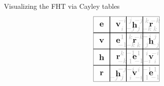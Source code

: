 \documentclass[8pt]{beamer}
\begin{document}
\begin{frame}{Visualizing the FHT via Cayley tables}
\[\begin{tikzpicture}[scale=.42]
\begin{scope}[shift={(14,0)}]
      \node at (3.5,1.5) {$-j$};
      \node at (4.5,8.5) {$-i$};
      \node at (4.5,7.5) {$i$};
      \node at (4.5,6.5) {$1$};
      \node at (4.5,5.5) {$-1$}; 
      \node at (4.5,4.5) {$k$}; 
      \node at (4.5,3.5) {$-k$};
      \node at (4.5,2.5) {$-j$};
      \node at (4.5,1.5) {$j$};
      \node at (5.5,8.5) {$j$};
      \node at (5.5,7.5) {$-j$};
      \node at (5.5,6.5) {$k$};
      \node at (5.5,5.5) {$-k$}; 
      \node at (5.5,4.5) {$-1$}; 
      \node at (5.5,3.5) {$1$};
      \node at (5.5,2.5) {$-i$};
      \node at (5.5,1.5) {$i$};
      \node at (6.5,8.5) {$-j$};
      \node at (6.5,7.5) {$j$};
      \node at (6.5,6.5) {$-k$};
      \node at (6.5,5.5) {$k$}; 
      \node at (6.5,4.5) {$1$}; 
      \node at (6.5,3.5) {$-1$};
      \node at (6.5,2.5) {$i$};
      \node at (6.5,1.5) {$-i$};
      \node at (7.5,8.5) {$k$};
      \node at (7.5,7.5) {$-k$};
      \node at (7.5,6.5) {$-j$};
      \node at (7.5,5.5) {$j$}; 
      \node at (7.5,4.5) {$i$}; 
      \node at (7.5,3.5) {$-i$};
      \node at (7.5,2.5) {$-1$};
      \node at (7.5,1.5) {$1$};
      \node at (8.5,8.5) {$-k$};
      \node at (8.5,7.5) {$k$};
      \node at (8.5,6.5) {$j$};
      \node at (8.5,5.5) {$-j$}; 
      \node at (8.5,4.5) {$-i$}; 
      \node at (8.5,3.5) {$i$};
      \node at (8.5,2.5) {$1$};
      \node at (8.5,1.5) {$-1$};
      \filldraw[fill=white,opacity=0.7] 
      (1,1)--(9,1)--(9,9)--(1,9)--cycle;
      \draw[thick] (3,1)--(3,9);
      \draw[thick] (5,1)--(5,9);
      \draw[thick] (7,1)--(7,9); 
      \draw[thick] (1,3)--(9,3);
      \draw[thick] (1,5)--(9,5);
      \draw[thick] (1,7)--(9,7);
      \node at (2,8) {\large\bf $\mathbf{e}$};
      \node at (4,8) {\large\bf $\mathbf{v}$};
      \node at (6,8) {\large\bf $\mathbf{h}$};
      \node at (8,8) {\large\bf $\mathbf{r}$};
      \node at (2,6) {\large\bf $\mathbf{v}$};
      \node at (4,6) {\large\bf $\mathbf{e}$};
      \node at (6,6) {\large\bf $\mathbf{r}$};
      \node at (8,6) {\large\bf $\mathbf{h}$};
      \node at (2,4) {\large\bf $\mathbf{h}$};
      \node at (4,4) {\large\bf $\mathbf{r}$};
      \node at (6,4) {\large\bf $\mathbf{e}$};
      \node at (8,4) {\large\bf $\mathbf{v}$};
      \node at (2,2) {\large\bf $\mathbf{r}$};
      \node at (4,2) {\large\bf $\mathbf{h}$};
      \node at (6,2) {\large\bf $\mathbf{v}$};
      \node at (8,2) {\large\bf $\mathbf{e}$};
    \end{scope}
  \end{tikzpicture}
  \]
  
\end{frame}
\end{document}
